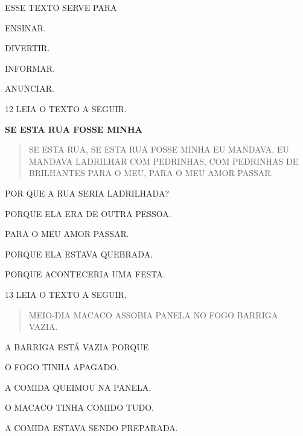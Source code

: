 ESSE TEXTO SERVE PARA

\begin{escolha}

\item ENSINAR.

\item DIVERTIR.

\item INFORMAR.

\item ANUNCIAR.

\end{escolha}

\num{12} LEIA O TEXTO A SEGUIR.

\begin{myquote}
\textbf{SE ESTA RUA FOSSE MINHA}

\begin{verse}
SE ESTA RUA, SE ESTA RUA
FOSSE MINHA
EU MANDAVA,
EU MANDAVA LADRILHAR
COM PEDRINHAS,
COM PEDRINHAS DE BRILHANTES
PARA O MEU,
PARA O MEU AMOR PASSAR.
\end{verse}

\end{myquote}

POR QUE A RUA SERIA LADRILHADA?

\begin{escolha}

\item PORQUE ELA ERA DE OUTRA PESSOA.

\item PARA O MEU AMOR PASSAR.

\item PORQUE ELA ESTAVA QUEBRADA.

\item PORQUE ACONTECERIA UMA FESTA.

\end{escolha}

\num{13} LEIA O TEXTO A SEGUIR.

\begin{myquote}
\begin{verse}
MEIO-DIA
MACACO ASSOBIA
PANELA NO FOGO
BARRIGA VAZIA.
\end{verse}
\end{myquote}

A BARRIGA ESTÁ VAZIA PORQUE

\begin{escolha}

\item O FOGO TINHA APAGADO.

\item A COMIDA QUEIMOU NA PANELA.

\item O MACACO TINHA COMIDO TUDO.

\item A COMIDA ESTAVA SENDO PREPARADA.

\end{escolha}

